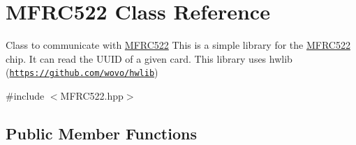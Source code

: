 \hypertarget{classMFRC522}{}\section{M\+F\+R\+C522 Class Reference}
\label{classMFRC522}


Class to communicate with \hyperlink{classMFRC522}{M\+F\+R\+C522}  This is a simple library for the \hyperlink{classMFRC522}{M\+F\+R\+C522} chip. It can read the U\+U\+ID of a given card. This library uses hwlib (\href{https://github.com/wovo/hwlib}{\tt https\+://github.\+com/wovo/hwlib})  




{\ttfamily \#include $<$M\+F\+R\+C522.\+hpp$>$}

\subsection*{Public Member Functions}
